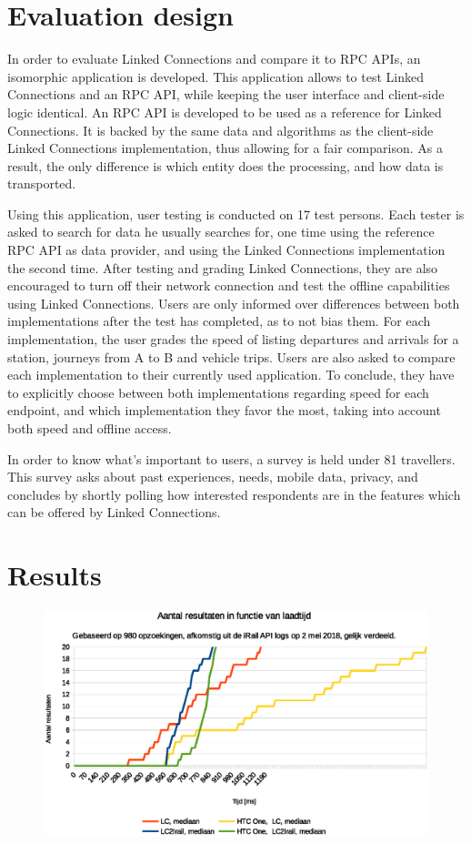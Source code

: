 \documentclass[twocolumn]{phdsymp} %
\begin{document}
\section{Evaluation design}

In order to evaluate Linked Connections and compare it to RPC APIs, an isomorphic application is developed. This application allows to test Linked Connections and an RPC API, while keeping the user interface and client-side logic identical. An RPC API is developed to be used as a reference for Linked Connections. It is backed by the same data and algorithms as the client-side Linked Connections implementation, thus allowing for a fair comparison. As a result, the only difference is which entity does the processing, and how data is transported.

Using this application, user testing is conducted on 17 test persons. Each tester is asked to search for data he usually searches for, one time using the reference RPC API as data provider, and using the Linked Connections implementation the second time. After testing and grading Linked Connections, they are also encouraged to turn off their network connection and test the offline capabilities using Linked Connections.
Users are only informed over differences between both implementations after the test has completed, as to not bias them. For each implementation, the user grades the speed of listing departures and arrivals for a station, journeys from A to B and vehicle trips. Users are also asked to compare each implementation to their currently used application. To conclude, they have to explicitly choose between both implementations regarding speed for each endpoint, and which implementation they favor the most, taking into account both speed and offline access. 

In order to know what's important to users, a survey is held under 81 travellers. This survey asks about past experiences, needs, mobile data, privacy, and concludes by shortly polling how interested respondents are in the features which can be offered by Linked Connections.

\section{Results}
\begin{figure}[ht]
	\begin{center}
		\includegraphics[width=.50\textwidth]{images/dief_liveboards_gemiddeld.eps}
		\caption{\label{fig:liveboard} }
	\end{center}
\end{figure}
\end{document}
